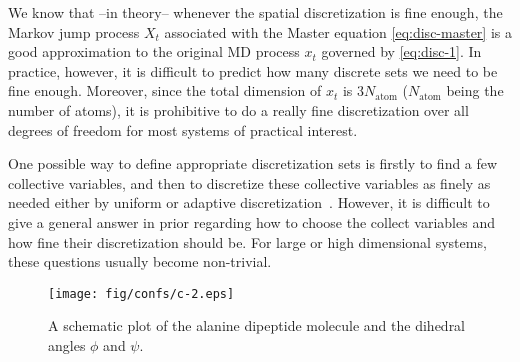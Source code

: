 \documentclass[aps, pre, preprint,unsortedaddress,a4paper,onecolumn,showkeys]{revtex4}
\begin{document}
We know that --in theory-- whenever the spatial discretization is fine enough, the Markov jump
process $X_t$ associated with the Master equation \eqref{eq:disc-master} is a good approximation to the original
MD process $x_t$ governed by \eqref{eq:disc-1}.  In practice, however, it is difficult to predict
how many discrete sets we need to be fine enough. Moreover, since the
total dimension of $x_t$ is $3N_{\textrm{atom}}$ ($N_{\textrm{atom}}$ being the number of atoms), it is prohibitive to do a really fine discretization
over all degrees of freedom for most systems of practical interest.

One possible way to define appropriate discretization sets is firstly to find a few collective
variables, and then to discretize these collective variables as finely as needed either by uniform or adaptive
discretization~\cite{chodera2007automatic, prinz2011markov}.
However, it is difficult to give a general answer in prior regarding
how to choose the collect variables and how fine their discretization should be.
For large or high dimensional systems, these questions usually become non-trivial. 

\begin{figure}
  \centering
  \texttt{[image: fig/confs/c-2.eps]}
  \caption{A schematic plot of the alanine dipeptide molecule and the dihedral angles $\phi$ and $\psi$.}
  \label{fig:tmp1}
\end{figure}
\end{document}

